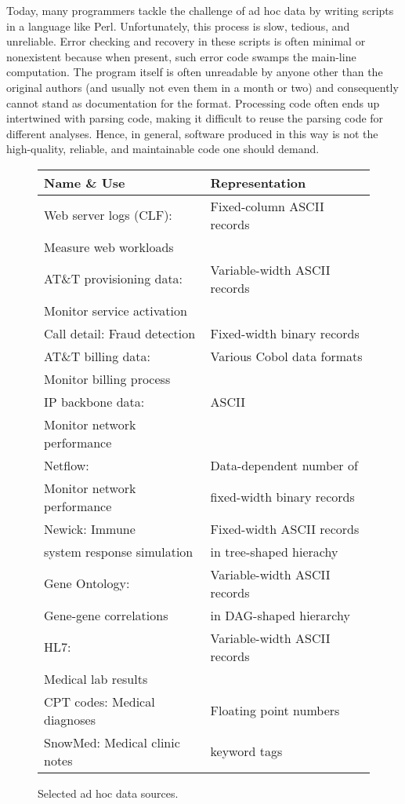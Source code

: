 Today, many programmers tackle the challenge of ad hoc data by writing
scripts in a language like Perl.  Unfortunately, this process is slow,
tedious, and unreliable.  Error checking and recovery in these scripts
is often minimal or nonexistent because when present, such error code swamps the main-line computation.  The program itself is often
unreadable by anyone other than the original authors (and
usually not even them in a month or two) and consequently cannot stand as
documentation for the format.  Processing code often ends up intertwined with parsing code, making it difficult to reuse the parsing code for different analyses. Hence, in general, software produced
in this way is not the high-quality, reliable, and maintainable 
code one should demand.

\begin{figure}
\begin{center}
\begin{tabular}{|l|l|}
\hline
Name \& Use   &  Representation               \\ \hline\hline
Web server logs (CLF):  &  Fixed-column ASCII records \\ 
Measure web workloads &                             \\ \hline
AT\&T provisioning data: & Variable-width ASCII records  \\ 
Monitor service activation &                              \\ \hline
Call detail: Fraud detection  &  Fixed-width binary records \\  \hline 
AT\&T billing data: & Various Cobol data formats  \\ 
Monitor billing process   &                             \\ \hline
IP backbone data:  & ASCII   \\
Monitor network performance  &        \\ \hline
Netflow:                        & Data-dependent number of     \\ 
Monitor network performance  & fixed-width binary records  \\ \hline
Newick:   Immune                 & Fixed-width ASCII records \\ 
system response simulation & in tree-shaped hierachy\\ \hline                                
Gene Ontology:             & Variable-width ASCII records \\
Gene-gene correlations     & in DAG-shaped hierarchy \\ \hline
HL7:             & Variable-width ASCII records \\
Medical lab results     &  \\ \hline
CPT codes: Medical diagnoses & Floating point numbers \\ \hline
SnowMed: Medical clinic notes & keyword tags  \\ \hline


\end{tabular}


\caption{Selected ad hoc data sources.}
\label{figure:data-sources}
\end{center}
\end{figure}
 
